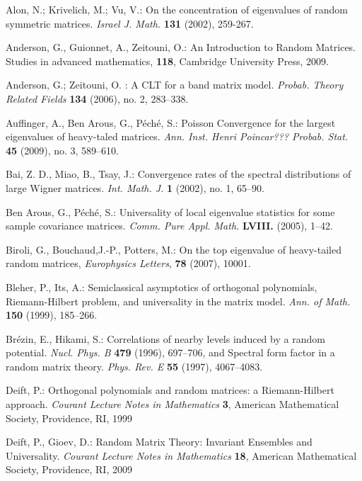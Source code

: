 \documentclass[draft]{article}
\numberwithin{equation}{section}
\numberwithin{theorem}{section}
\numberwithin{definition}{section}
\numberwithin{remark}{section}
\begin{document}
  Alon, N.; Krivelich, M.; Vu, V.: On the concentration
of eigenvalues of random symmetric matrices.
{\it Israel J. Math.} {\bf 131} (2002), 259-267.




  Anderson, G., Guionnet, A., Zeitouni, O.:  An Introduction
to Random Matrices. Studies in advanced mathematics, {\bf 118}, Cambridge
University Press, 2009.



 Anderson, G.; Zeitouni, O. : 
 A CLT for a band matrix model. {\it Probab. Theory Related Fields} {\bf 134} (2006), no. 2, 283--338.



 Auffinger, A., Ben Arous, G.,
 P\'ech\'e, S.: Poisson Convergence for the largest eigenvalues of
heavy-taled matrices.
{\it  Ann. Inst. Henri Poincar??? Probab. Stat.}
{\bf 45}  (2009),  no. 3, 589--610. 

 Bai, Z. D., Miao, B.,
 Tsay, J.: Convergence rates of the spectral distributions
 of large Wigner matrices.  {\it Int. Math. J.}  {\bf 1}
  (2002),  no. 1, 65--90.



 Ben Arous, G., P\'ech\'e, S.: Universality of local
eigenvalue statistics for some sample covariance matrices.
{\it Comm. Pure Appl. Math.} {\bf LVIII.} (2005), 1--42.


 Biroli, G., Bouchaud,J.-P.,
 Potters, M.: On the top eigenvalue of heavy-tailed random matrices,
{\it Europhysics Letters}, {\bf 78} (2007), 10001.


 Bleher, P.,  Its, A.: Semiclassical asymptotics of 
orthogonal polynomials, Riemann-Hilbert problem, and universality
 in the matrix model. {\it Ann. of Math.} {\bf 150} (1999), 185--266.


 Br\'ezin, E., Hikami, S.: Correlations of nearby levels induced
by a random potential. {\it Nucl. Phys. B} {\bf 479} (1996), 697--706, and
Spectral form factor in a random matrix theory. {\it Phys. Rev. E}
{\bf 55} (1997), 4067--4083.



 Deift, P.: Orthogonal polynomials and
random matrices: a Riemann-Hilbert approach.
{\it Courant Lecture Notes in Mathematics} {\bf 3},
American Mathematical Society, Providence, RI, 1999


 Deift, P., Gioev, D.: Random Matrix Theory: Invariant
Ensembles and Universality. {\it Courant Lecture Notes in Mathematics} {\bf 18},
American Mathematical Society, Providence, RI, 2009
\end{document}

